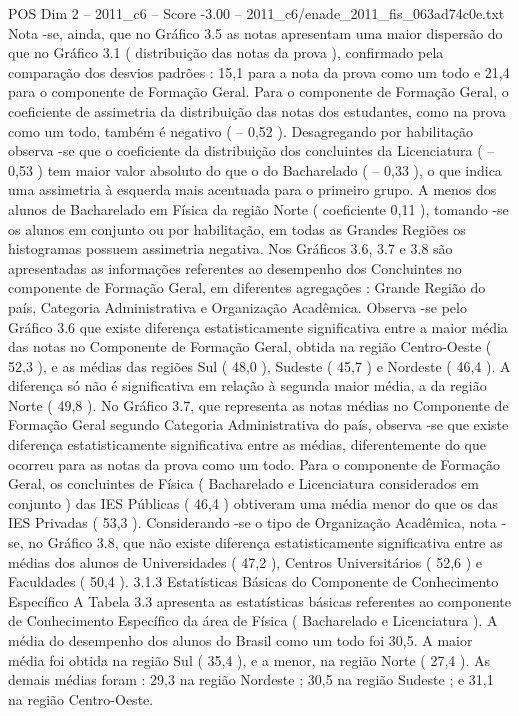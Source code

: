 \begin{textsample}{POS Dim 2 – 2011\_c6 – Score -3.00 – 2011\_c6/enade\_2011\_fis\_063ad74c0e.txt}
Nota -se, ainda, que no Gráfico 3.5 as notas apresentam uma maior dispersão do que no Gráfico 3.1 ( distribuição das notas da prova ), confirmado pela comparação dos desvios padrões : 15,1 para a nota da prova como um todo e 21,4 para o componente de Formação Geral.
Para o componente de Formação Geral, o coeficiente de assimetria da distribuição das notas dos estudantes, como na prova como um todo, também é negativo ( – 0,52 ).
Desagregando por habilitação observa -se que o coeficiente da distribuição dos concluintes da Licenciatura ( – 0,53 ) tem maior valor absoluto do que o do Bacharelado ( – 0,33 ), o que indica uma assimetria à esquerda mais acentuada para o primeiro grupo.
A menos dos alunos de Bacharelado em Física da região Norte ( coeficiente 0,11 ), tomando -se os alunos em conjunto ou por habilitação, em todas as Grandes Regiões os histogramas possuem assimetria negativa.
Nos Gráficos 3.6, 3.7 e 3.8 são apresentadas as informações referentes ao desempenho dos Concluintes no componente de Formação Geral, em diferentes agregações : Grande Região do país, Categoria Administrativa e Organização Acadêmica.
Observa -se pelo Gráfico 3.6 que existe diferença estatisticamente significativa entre a maior média das notas no Componente de Formação Geral, obtida na região Centro-Oeste ( 52,3 ), e as médias das regiões Sul ( 48,0 ), Sudeste ( 45,7 ) e Nordeste ( 46,4 ).
A diferença só não é significativa em relação à segunda maior média, a da região Norte ( 49,8 ).
No Gráfico 3.7, que representa as notas médias no Componente de Formação Geral segundo Categoria Administrativa do país, observa -se que existe diferença estatisticamente significativa entre as médias, diferentemente do que ocorreu para as notas da prova como um todo.
Para o componente de Formação Geral, os concluintes de Física ( Bacharelado e Licenciatura considerados em conjunto ) das IES Públicas ( 46,4 ) obtiveram uma média menor do que os das IES Privadas ( 53,3 ).
Considerando -se o tipo de Organização Acadêmica, nota -se, no Gráfico 3.8, que não existe diferença estatisticamente significativa entre as médias dos alunos de Universidades ( 47,2 ), Centros Universitários ( 52,6 ) e Faculdades ( 50,4 ). 3.1.3 Estatísticas Básicas do Componente de Conhecimento Específico A Tabela 3.3 apresenta as estatísticas básicas referentes ao componente de Conhecimento Específico da área de Física ( Bacharelado e Licenciatura ).
A média do desempenho dos alunos do Brasil como um todo foi 30,5.
A maior média foi obtida na região Sul ( 35,4 ), e a menor, na região Norte ( 27,4 ).
As demais médias foram : 29,3 na região Nordeste ; 30,5 na região Sudeste ; e 31,1 na região Centro-Oeste.

\end{textsample}
